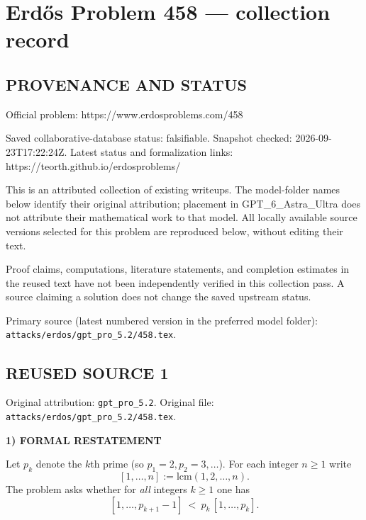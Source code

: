 \section*{Erd\H{o}s Problem 458 --- collection record}

\subsection*{PROVENANCE AND STATUS}
Official problem: https://www.erdosproblems.com/458

Saved collaborative-database status: falsifiable.
Snapshot checked: 2026-09-23T17:22:24Z.
Latest status and formalization links: https://teorth.github.io/erdosproblems/

This is an attributed collection of existing writeups. The model-folder names below identify their original attribution; placement in GPT\_6\_Astra\_Ultra does not attribute their mathematical work to that model. All locally available source versions selected for this problem are reproduced below, without editing their text.

Proof claims, computations, literature statements, and completion estimates in the reused text have not been independently verified in this collection pass. A source claiming a solution does not change the saved upstream status.

Primary source (latest numbered version in the preferred model folder): \texttt{attacks/erdos/gpt\_pro\_5.2/458.tex}.

\subsection*{REUSED SOURCE 1}
Original attribution: \texttt{gpt\_pro\_5.2}.
Original file: \texttt{attacks/erdos/gpt\_pro\_5.2/458.tex}.


\noindent\textbf{1) FORMAL RESTATEMENT}

Let $p_k$ denote the $k$th prime (so $p_1=2,p_2=3,\dots$).  For each integer $n\ge 1$ write
\[[1,\dots,n]:=\mathrm{lcm}(1,2,\dots,n).
\]
The problem asks whether for \emph{all} integers $k\ge 1$ one has
\[[1,\dots,p_{k+1}-1]\ <\ p_k\,[1,\dots,p_k].\]

